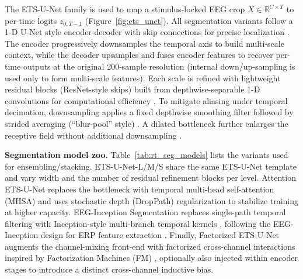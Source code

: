 \documentclass[12pt]{article}
\begin{document}
The ETS-U-Net family is used to map a stimulus-locked EEG crop
$X\in\mathbb{R}^{C\times T}$ to per-time logits $z_{0:T-1}$ (Figure~\ref{fig:ets_unet}). All segmentation variants follow a 1-D U-Net style encoder-decoder with skip
connections for precise localization \citep{ronneberger2015unet}. The encoder progressively downsamples the temporal axis
to build multi-scale context, while the decoder upsamples and fuses encoder features to recover per-time outputs at the
original 200-sample resolution (internal down/up-sampling is used only to form multi-scale features). Each scale is refined
with lightweight residual blocks (ResNet-style skips) \citep{he2016resnet} built from depthwise-separable 1-D convolutions
for computational efficiency \citep{howard2017mobilenets,chollet2017xception}. To mitigate aliasing under temporal
decimation, downsampling applies a fixed depthwise smoothing filter followed by strided averaging (``blur-pool'' style)
\citep{zhang2019shiftinvariant}. A dilated bottleneck further enlarges the receptive field without additional downsampling
\citep{yu2016dilated}.

\textbf{Segmentation model zoo.} Table~\ref{tab:rt_seg_models} lists the variants used for ensembling/stacking.
ETS-U-Net-L/M/S share the same ETS-U-Net template and vary width and the number of residual refinement blocks per level.
Attention ETS-U-Net replaces the bottleneck with temporal multi-head self-attention (MHSA) \citep{vaswani2017attention} and uses
stochastic depth (DropPath) regularization \citep{huang2016stochasticdepth} to stabilize training at higher capacity.
EEG-Inception Segmentation replaces single-path temporal filtering with Inception-style multi-branch temporal kernels
\citep{szegedy2015going}, following the EEG-Inception design for ERP feature extraction \citep{santamaria2020eeginception}.
Finally, Factorized ETS-U-Net augments the channel-mixing front-end with factorized cross-channel interactions inspired by
Factorization Machines (FM) \citep{rendle2010fm}, optionally also injected within encoder stages to introduce a distinct
cross-channel inductive bias.
\end{document}

